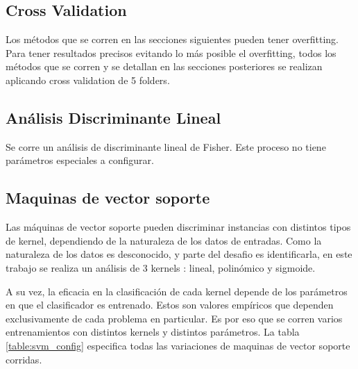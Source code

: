 \documentclass[journal]{IEEEtran}
\begin{document}
\subsection{Cross Validation}
Los métodos que se corren en las secciones siguientes pueden tener overfitting. Para
tener resultados precisos evitando lo más posible el overfitting, todos los
métodos que se corren y se detallan en las secciones posteriores se realizan
aplicando cross validation de 5 folders.

\subsection{Análisis Discriminante Lineal}
Se corre un análisis de discriminante lineal de Fisher. Este proceso no 
tiene parámetros especiales a configurar.

\subsection{Maquinas de vector soporte}
Las máquinas de vector soporte pueden discriminar instancias con distintos
tipos de kernel, dependiendo de la naturaleza de los datos de entradas. Como
la naturaleza de los datos es desconocido, y parte del desafio es identificarla,
en este trabajo se realiza un análisis de 3 kernels : lineal,
polinómico y sigmoide.

A su vez, la eficacia en la clasificación de cada kernel depende de los
parámetros en que el clasificador es entrenado. Estos son valores empíricos
que dependen exclusivamente de cada problema en particular. Es por eso
que se corren varios entrenamientos con distintos kernels y distintos parámetros.
La tabla \ref{table:svm_config} especifica todas las variaciones de maquinas 
de vector soporte corridas.
\end{document}
